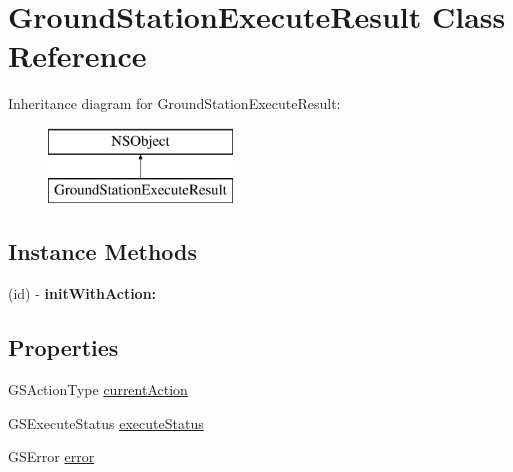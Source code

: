 \hypertarget{interface_ground_station_execute_result}{\section{Ground\+Station\+Execute\+Result Class Reference}
\label{interface_ground_station_execute_result}
}
Inheritance diagram for Ground\+Station\+Execute\+Result\+:\begin{figure}[H]
\begin{center}
\leavevmode
\includegraphics[height=2.000000cm]{interface_ground_station_execute_result}
\end{center}
\end{figure}
\subsection*{Instance Methods}
\begin{DoxyCompactItemize}
\item 
\hypertarget{interface_ground_station_execute_result_aed506ad3e7e9e0be36278fe0707e397f}{(id) -\/ {\bfseries init\+With\+Action\+:}}\label{interface_ground_station_execute_result_aed506ad3e7e9e0be36278fe0707e397f}

\end{DoxyCompactItemize}
\subsection*{Properties}
\begin{DoxyCompactItemize}
\item 
G\+S\+Action\+Type \hyperlink{interface_ground_station_execute_result_aed74c158994195c5f0ac2bdb0577b02e}{current\+Action}
\item 
G\+S\+Execute\+Status \hyperlink{interface_ground_station_execute_result_ab3cb1e15e2841548938ce23f1bacc612}{execute\+Status}
\item 
G\+S\+Error \hyperlink{interface_ground_station_execute_result_a3bf529c213113e8f28264e9d50228425}{error}
\end{DoxyCompactItemize}


